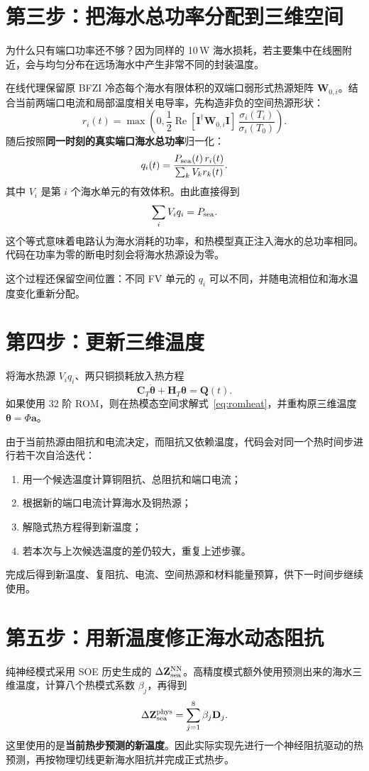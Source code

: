 \section{第三步：把海水总功率分配到三维空间}
为什么只有端口功率还不够？因为同样的 10\,W 海水损耗，若主要集中在线圈附近，会与均匀分布在远场海水中产生非常不同的封装温度。

在线代理保留原 BFZI 冷态每个海水有限体积的双端口弱形式热源矩阵 $\mathbf W_{0,i}$。结合当前两端口电流和局部温度相关电导率，先构造非负的空间热源形状：
\[
r_i(t)=\max\!\left(
0,\frac12\operatorname{Re}
[\mathbf I^\dagger\mathbf W_{0,i}\mathbf I]\,
\frac{\sigma_i(T_i)}{\sigma_i(T_0)}
\right).
\]
随后按照\textbf{同一时刻的真实端口海水总功率}归一化：
\begin{equation}
\label{eq:qnorm}
q_i(t)=
\frac{P_{\rm sea}(t)\,r_i(t)}
{\sum_k V_k r_k(t)}.
\end{equation}
其中 $V_i$ 是第 $i$ 个海水单元的有效体积。由此直接得到
\[
\sum_iV_iq_i=P_{\rm sea}.
\]
这个等式意味着电路认为海水消耗的功率，和热模型真正注入海水的总功率相同。代码在功率为零的断电时刻会将海水热源设为零。

这个过程还保留空间位置：不同 FV 单元的 $q_i$ 可以不同，并随电流相位和海水温度变化重新分配。

\section{第四步：更新三维温度}
将海水热源 $V_iq_i$、两只铜损耗放入热方程
\[
\mathbf C_T\dot{\boldsymbol\theta}
+\mathbf H_T\boldsymbol\theta=\mathbf Q(t).
\]
如果使用 32 阶 ROM，则在热模态空间求解式~\eqref{eq:romheat}，并重构原三维温度 $\boldsymbol\theta=\Phi\mathbf a$。

由于当前热源由阻抗和电流决定，而阻抗又依赖温度，代码会对同一个热时间步进行若干次自洽迭代：
\begin{enumerate}
\item 用一个候选温度计算铜阻抗、总阻抗和端口电流；
\item 根据新的端口电流计算海水及铜热源；
\item 解隐式热方程得到新温度；
\item 若本次与上次候选温度的差仍较大，重复上述步骤。
\end{enumerate}
完成后得到新温度、复阻抗、电流、空间热源和材料能量预算，供下一时间步继续使用。

\section{第五步：用新温度修正海水动态阻抗}
纯神经模式采用 SOE 历史生成的 $\Delta\mathbf Z_{\mathrm{sea}}^{\rm NN}$。高精度模式额外使用预测出来的海水三维温度，计算八个热模式系数 $\beta_j$，再得到
\[
\Delta\mathbf Z_{\mathrm{sea}}^{\rm phys}=\sum_{j=1}^8\beta_j\mathbf D_j.
\]
这里使用的是\textbf{当前热步预测的新温度}。因此实际实现先进行一个神经阻抗驱动的热预测，再按物理切线更新海水阻抗并完成正式热步。

